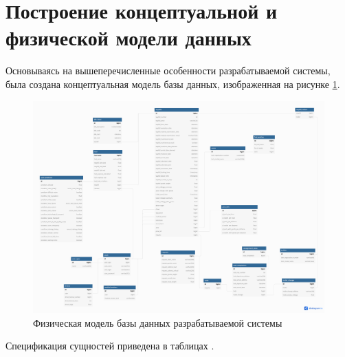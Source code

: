 \documentclass[../nirs.tex]{subfiles}
\begin{document}
\section{Построение концептуальной и физической модели данных}
Основываясь на вышеперечисленные особенности разрабатываемой системы, была
создана концептуальная модель базы данных, изображенная на рисунке
\ref{fig:3_1_db_conceptual}.

\begin{figure}[H]
	\centering
	\includegraphics[keepaspectratio,width=\textwidth]{./images/3_1_db_conceptual.png}
	\caption{Физическая модель базы данных разрабатываемой системы}
	\label{fig:3_1_db_conceptual}
\end{figure}

Спецификация сущностей приведена в таблицах .


\end{document}
